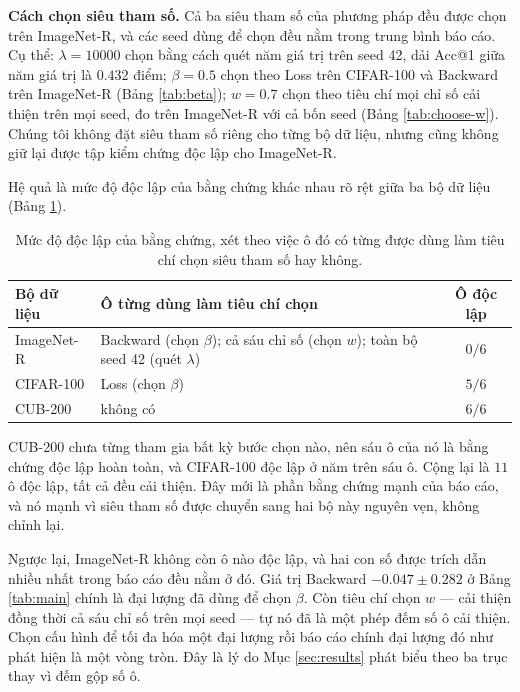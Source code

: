 \documentclass[11pt,a4paper]{article}
\begin{document}
\textbf{Cách chọn siêu tham số.} Cả ba siêu tham số của phương pháp đều được
chọn trên ImageNet-R, và các seed dùng để chọn đều nằm trong trung bình báo cáo.
Cụ thể: $\lambda = 10000$ chọn bằng cách quét năm giá trị trên seed 42, dải
Acc@1 giữa năm giá trị là $0.432$ điểm; $\beta = 0.5$ chọn theo Loss trên
CIFAR-100 và Backward trên ImageNet-R (Bảng \ref{tab:beta}); $w = 0.7$ chọn theo
tiêu chí mọi chỉ số cải thiện trên mọi seed, đo trên ImageNet-R với cả bốn seed
(Bảng \ref{tab:choose-w}). Chúng tôi không đặt siêu tham số riêng cho từng bộ dữ
liệu, nhưng cũng không giữ lại được tập kiểm chứng độc lập cho ImageNet-R.

Hệ quả là mức độ độc lập của bằng chứng khác nhau rõ rệt giữa ba bộ dữ liệu
(Bảng \ref{tab:tuning-scope}).

\begin{table}[htbp]
\centering
\caption{Mức độ độc lập của bằng chứng, xét theo việc ô đó có từng được dùng làm
tiêu chí chọn siêu tham số hay không.}
\label{tab:tuning-scope}
\begin{tabular}{@{}lp{6.4cm}c@{}}
\toprule
Bộ dữ liệu & Ô từng dùng làm tiêu chí chọn & Ô độc lập \\
\midrule
ImageNet-R & Backward (chọn $\beta$); cả sáu chỉ số (chọn $w$); toàn bộ seed 42
             (quét $\lambda$) & $0/6$ \\
CIFAR-100  & Loss (chọn $\beta$) & $5/6$ \\
CUB-200    & không có & $6/6$ \\
\bottomrule
\end{tabular}
\end{table}

CUB-200 chưa từng tham gia bất kỳ bước chọn nào, nên sáu ô của nó là bằng chứng
độc lập hoàn toàn, và CIFAR-100 độc lập ở năm trên sáu ô. Cộng lại là $11$ ô
độc lập, tất cả đều cải thiện. Đây mới là phần bằng chứng mạnh của báo cáo, và
nó mạnh vì siêu tham số được chuyển sang hai bộ này nguyên vẹn, không chỉnh lại.

Ngược lại, ImageNet-R không còn ô nào độc lập, và hai con số được trích dẫn
nhiều nhất trong báo cáo đều nằm ở đó. Giá trị Backward $-0.047 \pm 0.282$ ở
Bảng \ref{tab:main} chính là đại lượng đã dùng để chọn $\beta$. Còn tiêu chí chọn $w$ --- cải thiện đồng thời cả sáu chỉ số trên mọi
seed --- tự nó đã là một phép đếm số ô cải thiện. Chọn cấu hình để tối đa hóa
một đại lượng rồi báo cáo chính đại lượng đó như phát hiện là một vòng tròn. Đây
là lý do Mục \ref{sec:results} phát biểu theo ba trục thay vì đếm gộp số ô.
\end{document}
